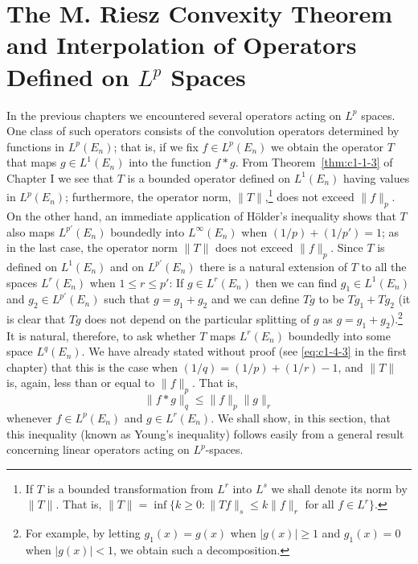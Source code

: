 \section{The M. Riesz Convexity Theorem and Interpolation of Operators Defined
on \texorpdfstring{$L^{p}$}{Lp} Spaces}

In the previous chapters we encountered several operators acting on $L^{p}$
spaces. One class of such operators consists of the convolution operators
determined by functions in $L^{p}(E_{n})$; that is, if we fix
$f \in L^{p}(E_{n})$ we obtain the operator $T$ that maps $g \in L^{1}(E_{n})$
into the function $f * g$. From Theorem~\ref{thm:c1-1-3} of Chapter I we see
that $T$ is a bounded operator defined on $L^{1}(E_{n})$ having values in
$L^{p}(E_{n})$; furthermore, the operator norm,
$\|T\|$,\footnote{If $T$ is a bounded transformation from $L^{r}$ into $L^{s}$
we shall denote its norm by $\|T\|$. That is,
$\|T\| = \inf\{k \geq 0 : \|Tf\|_{s} \leq k\|f\|_{r} \text{ for all } f \in L^{r}\}$.}
does not exceed $\|f\|_{p}$. On the other hand, an immediate application of
H\"older's inequality shows that $T$ also maps $L^{p'}(E_{n})$ boundedly into
$L^{\infty}(E_{n})$ when $(1/p) + (1/p') = 1$; as in the last case, the
operator norm $\|T\|$ does not exceed $\|f\|_{p}$. Since $T$ is defined on
$L^{1}(E_{n})$ and on $L^{p'}(E_{n})$ there is a natural extension of $T$ to
all the spaces $L^{r}(E_{n})$ when $1 \leq r \leq p'$: If $g \in L^{r}(E_{n})$
then we can find $g_{1} \in L^{1}(E_{n})$ and $g_{2} \in L^{p'}(E_{n})$ such
that $g = g_{1} + g_{2}$ and we can define $Tg$ to be $Tg_{1} + Tg_{2}$ (it is
clear that $Tg$ does not depend on the particular splitting of $g$ as
$g = g_{1} + g_{2}$).\footnote{For example, by letting $g_{1}(x) = g(x)$ when
$|g(x)| \geq 1$ and $g_{1}(x) = 0$ when $|g(x)| < 1$, we obtain such a
decomposition.} It is natural, therefore, to ask whether $T$ maps $L^{r}(E_{n})$
boundedly into some space $L^{q}(E_{n})$. We have already stated without proof
(see \eqref{eq:c1-4-3} in the first chapter) that this is the case when
$(1/q) = (1/p) + (1/r) - 1$, and $\|T\|$ is, again, less than or equal to
$\|f\|_{p}$. That is,
\begin{equation}\label{eq:c5-1-1}
\|f*g\|_{q}\leq\|f\|_{p}\|g\|_{r}
\end{equation}
whenever $f \in L^{p}(E_{n})$ and $g \in L^{r}(E_{n})$. We shall show, in this
section, that this inequality (known as Young's inequality) follows easily from
a general result concerning linear operators acting on $L^{p}$-spaces.

